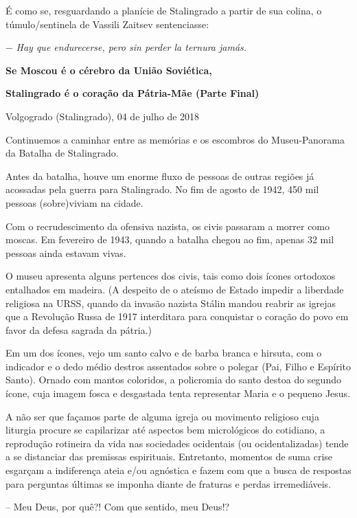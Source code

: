 É como se, resguardando a planície de Stalingrado a partir de sua
colina, o túmulo/sentinela de Vassili Zaitsev sentenciasse:

− \emph{Hay que endurecerse, pero sin perder la ternura jamás.}

\textbf{Se Moscou é o cérebro da União Soviética, }

\textbf{Stalingrado é o coração da Pátria-Mãe (Parte Final)}

Volgogrado (Stalingrado), 04 de julho de 2018

Continuemos a caminhar entre as memórias e os escombros do
Museu-Panorama da Batalha de Stalingrado.

Antes da batalha, houve um enorme fluxo de pessoas de outras regiões já
acossadas pela guerra para Stalingrado. No fim de agosto de 1942, 450
mil pessoas (sobre)viviam na cidade.

Com o recrudescimento da ofensiva nazista, os civis passaram a morrer
como moscas. Em fevereiro de 1943, quando a batalha chegou ao fim,
apenas 32 mil pessoas ainda estavam vivas.

O museu apresenta alguns pertences dos civis, tais como dois ícones
ortodoxos entalhados em madeira. (A despeito de o ateísmo de Estado
impedir a liberdade religiosa na URSS, quando da invasão nazista Stálin
mandou reabrir as igrejas que a Revolução Russa de 1917 interditara para
conquistar o coração do povo em favor da defesa sagrada da pátria.)

Em um dos ícones, vejo um santo calvo e de barba branca e hirsuta, com o
indicador e o dedo médio destros assentados sobre o polegar (Pai, Filho
e Espírito Santo). Ornado com mantos coloridos, a policromia do santo
destoa do segundo ícone, cuja imagem fosca e desgastada tenta
representar Maria e o pequeno Jesus.

A não ser que façamos parte de alguma igreja ou movimento religioso cuja
liturgia procure se capilarizar até aspectos bem micrológicos do
cotidiano, a reprodução rotineira da vida nas sociedades ocidentais (ou
ocidentalizadas) tende a se distanciar das premissas espirituais.
Entretanto, momentos de suma crise esgarçam a indiferença ateia e/ou
agnóstica e fazem com que a busca de respostas para perguntas últimas se
imponha diante de fraturas e perdas irremediáveis.

-- Meu Deus, por quê?! Com que sentido, meu Deus!?

